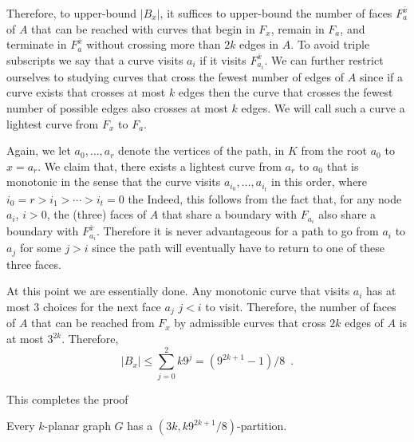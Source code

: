 \documentclass{patmorin}
\begin{document}
Therefore, to upper-bound $|B_x|$, it suffices to upper-bound the number of faces $F^{\bar{x}}_a$ of $A$ that can be reached with curves that begin in $F_x$, remain in $F_a$, and terminate in $F^{\bar{x}}_a$ without crossing more than $2k$ edges in $A$.  To avoid triple subscripts we say that a curve visits $a_i$ if it visits $F^{\bar{x}}_{a_i}$.  We can further restrict ourselves to studying curves that cross the fewest number of edges of $A$ since if a curve exists that crosses at most $k$ edges then the curve that crosses the fewest number of possible edges also crosses at most $k$ edges.  We will call such a curve a lightest curve from $F_x$ to $F_a$.

Again, we let $a_0,\ldots,a_r$ denote the vertices of the path, in $K$ from the root $a_0$ to $x=a_r$.  We claim that, there exists a lightest curve from $a_r$ to $a_0$ that is monotonic in the sense that the curve visits $a_{i_0},\ldots,a_{i_t}$ in this order, where $i_0=r > i_1>\cdots>i_t=0$ the Indeed, this follows from the fact that, for any node $a_i$, $i>0$, the (three) faces of $A$ that share a boundary with $F_{a_i}$ also share a boundary with $F^{\bar{x}}_{a_i}$.  Therefore it is never advantageous for a path to go from $a_i$ to $a_j$ for some $j>i$ since the path will eventually have to return to one of these three faces.

At this point we are essentially done.  Any monotonic curve that visits $a_i$ has at most 3 choices for the next face $a_j$ $j<i$ to visit.  Therefore, the number of faces of $A$ that can be reached from $F_x$ by admissible curves that cross $2k$ edges of $A$ is at most $3^{2k}$. Therefore, 
\[
   |B_x| \le \sum_{j=0}^2k 9^j = (9^{2k+1}-1)/8 \enspace .
\]

This completes the proof

\begin{thm}
    Every $k$-planar graph $G$ has a $(3k,k9^{2k+1}/8)$-partition.
\end{thm}








\end{document}
